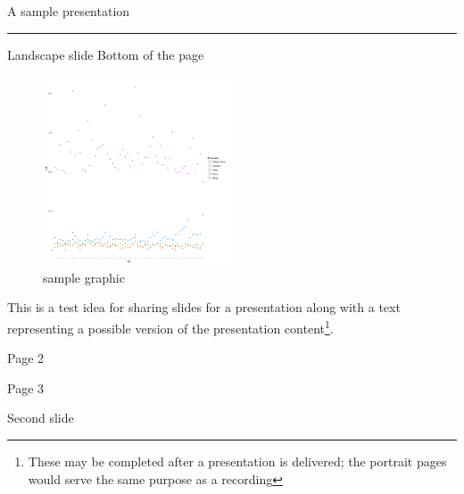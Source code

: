 \documentclass[11pt]{article}
\begin{document}
\begin{landscape}
\begin{center}
\vfill
\huge{A sample presentation}
\hrule\vspace{0.5cm}
\vfill
Landscape slide
\vfill
Bottom of the page
\end{center}
\end{landscape}


\begin{figure}
	\includegraphics[width=0.5\textwidth]{./images/genplot.png}
   \caption{sample graphic}
\end{figure}

This is a test idea for sharing slides for a presentation along with a text representing a possible version of the presentation content\footnote{These may be completed after a presentation is delivered; the portrait pages would serve the same purpose as a recording}.

\pagebreak
Page 2


\pagebreak
Page 3


\pagebreak

\begin{landscape}
  \begin{center}
    Second slide
  \end{center}
\end{landscape}


\end{document}
